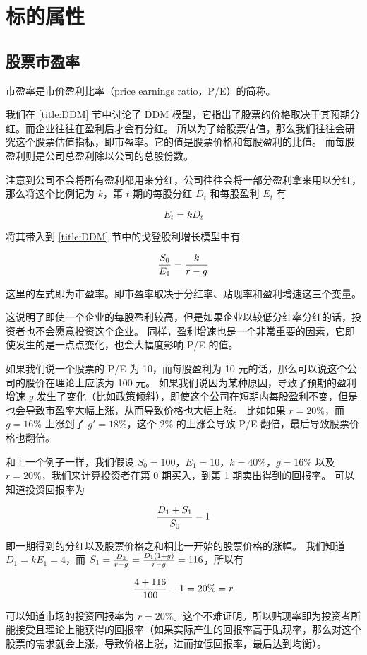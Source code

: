 \documentclass[utf8,a4paper,nofonts]{ctexbook}
\begin{document}
\section{标的属性}

\subsection{股票市盈率}

市盈率是市价盈利比率（price earnings ratio，P/E）的简称。

我们在 \ref{title:DDM} 节中讨论了 DDM 模型，它指出了股票的价格取决于其预期分红。而企业往往在盈利后才会有分红。
所以为了给股票估值，那么我们往往会研究这个股票估值指标，即市盈率。它的值是股票价格和每股盈利的比值。
而每股盈利则是公司总盈利除以公司的总股份数。

注意到公司不会将所有盈利都用来分红，公司往往会将一部分盈利拿来用以分红，那么将这个比例记为 $k$，第 $t$ 期的每股分红 $D_t$ 和每股盈利 $E_t$ 有

$$
E_t = kD_t
$$

将其带入到 \ref{title:DDM} 节中的戈登股利增长模型中有

$$
{S_0 \over E_1} = {k \over r - g}
$$

这里的左式即为市盈率。即市盈率取决于分红率、贴现率和盈利增速这三个变量。

这说明了即使一个企业的每股盈利较高，但是如果企业以较低分红率分红的话，投资者也不会愿意投资这个企业。
同样，盈利增速也是一个非常重要的因素，它即使发生的是一点点变化，也会大幅度影响 P/E 的值。

\begin{exampleBox}
如果我们说一个股票的 P/E 为 10，而每股盈利为 10 元的话，那么可以说这个公司的股价在理论上应该为 100 元。
如果我们说因为某种原因，导致了预期的盈利增速 $g$ 发生了变化（比如政策倾斜），即使这个公司在短期内每股盈利不变，但是也会导致市盈率大幅上涨，从而导致价格也大幅上涨。
比如如果 $r = 20\%$，而 $g = 16\%$ 上涨到了 $g' = 18\%$，这个 $2\%$ 的上涨会导致 P/E 翻倍，最后导致股票价格也翻倍。
\end{exampleBox}

\begin{exampleBox}
和上一个例子一样，我们假设 $S_0 = 100$，$E_1 = 10$，$k = 40\%$，$g = 16\%$ 以及 $r = 20\%$，我们来计算投资者在第 0 期买入，到第 1 期卖出得到的回报率。
可以知道投资回报率为

$$
{D_1 + S_1 \over S_0} - 1
$$

即一期得到的分红以及股票价格之和相比一开始的股票价格的涨幅。
我们知道 $D_1 = k E_1 = 4$，而 $S_1 = {D_2 \over r - g} = {D_1 (1 + g) \over r - g} = 116$，所以有

$$
{4 + 116 \over 100} - 1 = 20\% = r
$$

可以知道市场的投资回报率为 $r = 20\%$。这个不难证明。所以贴现率即为投资者所能接受且理论上能获得的回报率（如果实际产生的回报率高于贴现率，那么对这个股票的需求就会上涨，导致价格上涨，进而拉低回报率，最后达到均衡）。
\end{exampleBox}
\end{document}
